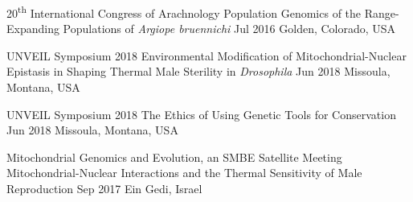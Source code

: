 
\begin{cventries}

  \cvpresentation
    {20\textsuperscript{th} International Congress of Arachnology} %
    {Population Genomics of the Range-Expanding Populations of \textit{Argiope bruennichi}} %
     {Jul 2016} %
    {Golden, Colorado, USA} %

\end{cventries}

\vspace{\baselineskip}
\vspace{-1mm}


\begin{cventries}

  \cvpresentation
    {UNVEIL Symposium 2018} %
    {Environmental Modification of Mitochondrial-Nuclear Epistasis in Shaping Thermal Male Sterility in \textit{Drosophila}} %
    {Jun 2018} %
    {Missoula, Montana, USA} %
    
  \cvpresentation
    {UNVEIL Symposium 2018}
    {The Ethics of Using Genetic Tools for Conservation}
    {Jun 2018}
    {Missoula, Montana, USA}  
    
   \cvpresentation
    {Mitochondrial Genomics and Evolution, an SMBE Satellite Meeting}
    {Mitochondrial-Nuclear Interactions and the Thermal Sensitivity of Male Reproduction}
    {Sep 2017}
    {Ein Gedi, Israel}
    
\end{cventries}

\vspace{\baselineskip}
\vspace{-1mm}


